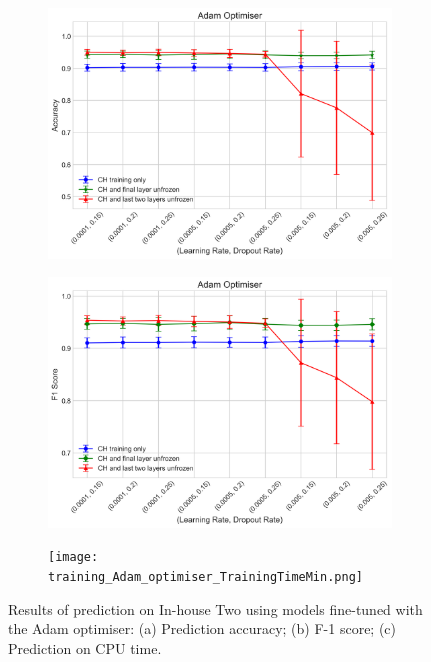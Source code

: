 \documentclass[a4paper,12pt]{article}
\newcommand{\figwidthh}{0.48\textwidth}
\begin{document}
\begin{figure}[p] 
	\begin{center}
		\begin{subfigure}[b]{\figwidthh}
			\caption{} 
			\includegraphics[width=\textwidth]{Adam_optimiser_accuracy.png}
		\end{subfigure}
        \hfill
		\begin{subfigure}[b]{\figwidthh}
			\caption{}
			\includegraphics[width=\textwidth]{Adam_optimiser_f1_score.png}
		\end{subfigure}
        \hfill
		\begin{subfigure}[b]{\figwidthh}
			\caption{}
			\texttt{[image: training\_Adam\_optimiser\_TrainingTimeMin.png]}
		\end{subfigure}
	\end{center}
	\caption{Results of prediction on In-house Two using models fine-tuned with the Adam optimiser: (a) Prediction accuracy; (b) F-1 score; (c) Prediction on CPU time.
	} 
	\label{fig:res_prdict_adam}
\end{figure}
\end{document}

